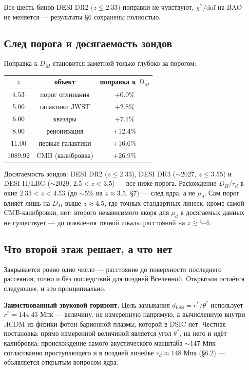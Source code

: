 \documentclass{article}
\begin{document}
Все шесть бинов DESI DR2 ($z \le 2.33$) поправки не чувствуют, $\chi^2/\text{dof}$ на BAO не меняется --- результаты \S6 сохранены полностью.

\subsection{След порога и досягаемость зондов}

Поправка к $D_M$ становится заметной только глубоко за порогом:

\begin{table}[htbp]
\centering
\small
\begin{tabular}{@{}ccc@{}}
\toprule
$z$ & объект & поправка к $D_M$ \\
\midrule
4.53 & порог отлипания & $+0.0\%$ \\
5.00 & галактики JWST & $+2.8\%$ \\
6.00 & квазары & $+7.1\%$ \\
8.00 & реионизация & $+12.4\%$ \\
11.00 & первые галактики & $+16.6\%$ \\
1089.92 & CMB (калибровка) & $+26.9\%$ \\
\bottomrule
\end{tabular}
\end{table}

Досягаемость зондов: DESI DR2 ($z \le 2.33$), DESI DR3 ($\sim$2027, $z \le 3.55$) и DESI-II/LBG ($\sim$2029, $2.5 < z < 3.5$) --- все ниже порога. Расхождение $D_H/r_d$ в окне $2.33 < z < 4.53$ (до ${\sim}5\%$ на $z \approx 3.5$, \S7) --- след ядра, а не $\mu_d$. Сам порог влияет лишь на $D_M$ выше $z \approx 4.5$, где точных стандартных линеек, кроме самой CMB-калибровки, нет: второго независимого якоря для $\mu_d$ в досягаемых данных не существует --- до появления точной шкалы расстояний на $z \gtrsim 5\text{--}6$.

\subsection{Что второй этаж решает, а что нет}

Закрывается ровно одно число --- расстояние до поверхности последнего рассеяния, точно и без последствий для поздней Вселенной. Открытым остаётся следующее, и это принципиально.

\medskip
\noindent\textbf{Заимствованный звуковой горизонт.} Цель замыкания $d_{\text{LSS}} = r^*/\theta^*$ использует $r^* = 144.43$ Мпк --- величину, не измеренную напрямую, а вычисленную внутри $\Lambda$CDM из физики фотон-барионной плазмы, которой в DSIC нет. Честная постановка: прямо измеренной величиной является угол $\theta^*$, на него и идёт калибровка; происхождение самого акустического масштаба ${\sim}147$ Мпк --- согласованно проступающего и в поздней линейке $r_d \approx 148$ Мпк (\S6.2) --- объявляется открытым вопросом ядра.
\end{document}
